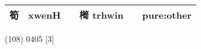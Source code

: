 \documentclass[14pt,a4paper]{scrartcl}
\begin{document}
\begin{longtable}[c]{@{}llllll@{}}
\begin{minipage}[t]{0.14\columnwidth}
筍
\strut\end{minipage} &
\begin{minipage}[t]{0.14\columnwidth}\raggedright\strut
xwenH
\strut\end{minipage} &
\begin{minipage}[t]{0.14\columnwidth}\raggedright\strut
\strut\end{minipage} &
\begin{minipage}[t]{0.14\columnwidth}\raggedright\strut
橁 trhwin
\strut\end{minipage} &
\begin{minipage}[t]{0.14\columnwidth}\raggedright\strut
\strut\end{minipage} &
\begin{minipage}[t]{0.14\columnwidth}\raggedright\strut
pure:other
\strut\end{minipage}\tabularnewline
\bottomrule
\end{longtable}

(108) 0405 {[}3{]}
\end{document}
